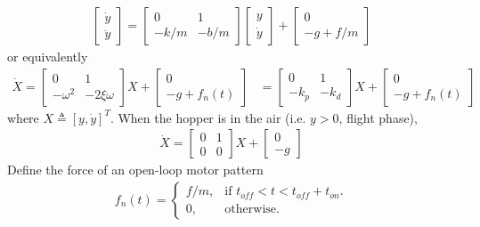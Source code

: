 \begin{align}
\begin{bmatrix}
\dot y  \\
\ddot y 
\end{bmatrix} = \begin{bmatrix}
0 & 1 \\
-k/m & -b/m
\end{bmatrix}\begin{bmatrix}
 y  \\
\dot y 
\end{bmatrix} + 
\begin{bmatrix}
0  \\
-g+f/m 
\end{bmatrix}
\end{align}
or equivalently
\begin{align}
\label{eq:groundEOM}
\dot X = \begin{bmatrix}
0 & 1 \\
-\omega^2 & -2\xi\omega
\end{bmatrix}X + 
\begin{bmatrix}
0  \\
-g+f_n(t)
\end{bmatrix} &= \begin{bmatrix}
0 & 1 \\
-k_p & -k_d
\end{bmatrix}X + 
\begin{bmatrix}
0  \\
-g+f_n(t)
\end{bmatrix}
\end{align}
where $X \triangleq [y,\dot y]^T$.
When the hopper is in the air (i.e. $y> 0$, flight phase), 
\begin{align}
\label{eq:airEOM}
\dot X = \begin{bmatrix}
0 & 1 \\
0 & 0
\end{bmatrix}X + 
\begin{bmatrix}
0  \\
-g 
\end{bmatrix}
\end{align}
\noindent Define the force  of an open-loop motor pattern
\begin{align}
 f_n(t)=\begin{cases}
    f/m, & \text{if $t_{off}<t<t_{off}+t_{on}$}.\\
    0, & \text{otherwise}.
  \end{cases}
\end{align}

